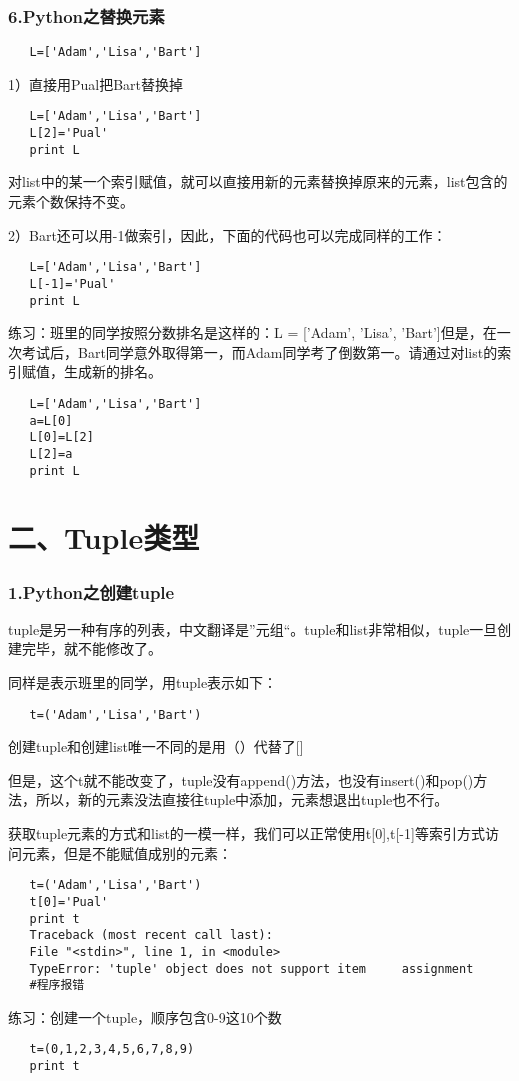 \documentclass{article}
\begin{document}
\begin{CJK}{UTF8}{gbsn}
\section*{6.Python之替换元素}
\begin{verbatim}
   L=['Adam','Lisa','Bart']
\end{verbatim}
\subparagraph*{}
1）直接用Pual把Bart替换掉
\begin{verbatim}
   L=['Adam','Lisa','Bart']
   L[2]='Pual'
   print L
\end{verbatim}
\subparagraph*{}
对list中的某一个索引赋值，就可以直接用新的元素替换掉原来的元素，list包含的元素个数保持不变。
\subparagraph*{}
2）Bart还可以用-1做索引，因此，下面的代码也可以完成同样的工作：
\begin{verbatim}
   L=['Adam','Lisa','Bart']
   L[-1]='Pual'
   print L
\end{verbatim}
\subparagraph*{}
练习：班里的同学按照分数排名是这样的：L = ['Adam', 'Lisa', 'Bart']但是，在一次考试后，Bart同学意外取得第一，而Adam同学考了倒数第一。请通过对list的索引赋值，生成新的排名。
\begin{verbatim}
   L=['Adam','Lisa','Bart']
   a=L[0]
   L[0]=L[2]
   L[2]=a
   print L
\end{verbatim}
\part*{二、Tuple类型}
\section*{1.Python之创建tuple}
\subparagraph*{}
tuple是另一种有序的列表，中文翻译是”元组“。tuple和list非常相似，tuple一旦创建完毕，就不能修改了。
\subparagraph*{}
同样是表示班里的同学，用tuple表示如下：
\begin{verbatim}
   t=('Adam','Lisa','Bart')
\end{verbatim}
\subparagraph*{}
创建tuple和创建list唯一不同的是用（）代替了[]
\subparagraph*{}
但是，这个t就不能改变了，tuple没有append()方法，也没有insert()和pop()方法，所以，新的元素没法直接往tuple中添加，元素想退出tuple也不行。
\subparagraph*{}
获取tuple元素的方式和list的一模一样，我们可以正常使用t[0],t[-1]等索引方式访问元素，但是不能赋值成别的元素：
\begin{verbatim}
   t=('Adam','Lisa','Bart')
   t[0]='Pual'
   print t
   Traceback (most recent call last):
   File "<stdin>", line 1, in <module>
   TypeError: 'tuple' object does not support item     assignment
   #程序报错
\end{verbatim}
\subparagraph*{}
练习：创建一个tuple，顺序包含0-9这10个数
\begin{verbatim}
   t=(0,1,2,3,4,5,6,7,8,9)
   print t
\end{verbatim}

\end{CJK}
\end{document}

